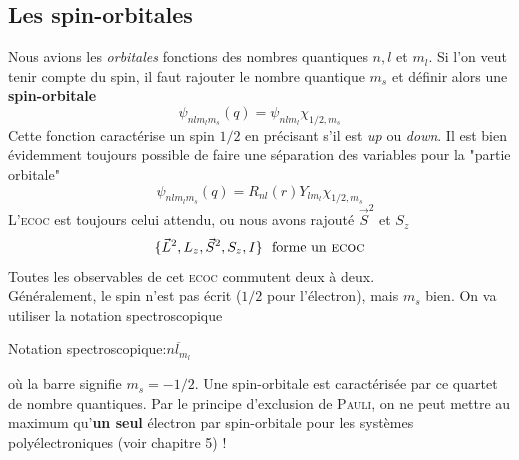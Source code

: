 \subsection{Les spin-orbitales}
Nous avions les \textit{orbitales} fonctions des nombres quantiques $n,l$ et $m_l$. Si l'on veut tenir compte
du spin, il faut rajouter le nombre quantique $m_s$ et définir alors une \textbf{spin-orbitale}
\begin{equation}
\psi_{nlm_lm_s}(q) =  \psi_{nlm_l}\chi_{1/2,m_s}
\end{equation}
Cette fonction caractérise un spin $1/2$ en précisant s'il est \textit{up} ou \textit{down}. Il est bien 
évidemment toujours possible de faire une séparation des variables pour la "partie orbitale"
\begin{equation}
\psi_{nlm_lm_s}(q) =  R_{nl}(r)Y_{lm_l}\chi_{1/2,m_s}
\end{equation}
L'\textsc{ecoc} est toujours celui attendu, ou nous avons rajouté $\vec{S}^2$ et $S_z$
\begin{equation}
\{\vec{L}^2, L_z, \vec{S}^2, S_z, I\}\ \text{ forme un \textsc{ecoc}}
\end{equation}
Toutes les observables de cet \textsc{ecoc} commutent deux à deux. \\

Généralement, le spin n'est pas écrit ($1/2$ pour l'électron), mais $m_s$ bien. On va utiliser la notation 
spectroscopique 
\begin{center}
Notation spectroscopique\quad :\quad $\overline{nl_{m_l}}$
\end{center}
où la barre signifie $m_s=-1/2$. Une spin-orbitale est caractérisée par ce quartet de nombre quantiques. Par
le principe d'exclusion de \textsc{Pauli}, on ne peut mettre au maximum qu'\textbf{un seul} électron par 
spin-orbitale pour les systèmes polyélectroniques (voir chapitre 5) !




